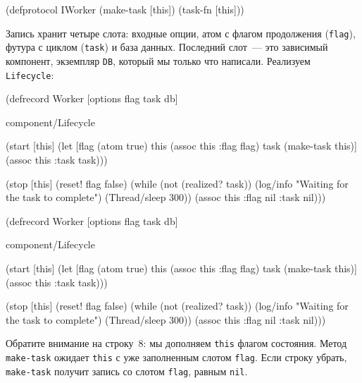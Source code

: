 \begin{english}
  \begin{clojure}
(defprotocol IWorker
  (make-task [this])
  (task-fn [this]))
  \end{clojure}
\end{english}

Запись хранит четыре слота: входные опции, атом с флагом продолжения
(\verb|flag|), футура с циклом (\verb|task|) и база данных. Последний слот~---
это зависимый компонент, экземпляр \verb|DB|, который мы только что
написали. Реализуем \verb|Lifecycle|:

\ifx\DEVICETYPE\MOBILE

\begin{english}
  \begin{clojure/lines}
(defrecord Worker
  [options flag task db]

  component/Lifecycle

  (start [this]
    (let [flag (atom true)
          this (assoc this :flag flag)
          task (make-task this)]
      (assoc this :task task)))

  (stop [this]
    (reset! flag false)
    (while (not (realized? task))
      (log/info
        "Waiting for
             the task to complete")
      (Thread/sleep 300))
    (assoc this :flag nil :task nil)))
  \end{clojure/lines}
\end{english}

\else

\begin{english}
  \begin{clojure/lines}
(defrecord Worker
  [options flag task db]

  component/Lifecycle

  (start [this]
    (let [flag (atom true)
          this (assoc this :flag flag)
          task (make-task this)]
      (assoc this :task task)))

  (stop [this]
    (reset! flag false)
    (while (not (realized? task))
      (log/info "Waiting for the task to complete")
      (Thread/sleep 300))
    (assoc this :flag nil :task nil)))
  \end{clojure/lines}
\end{english}

\fi

Обратите внимание на строку~8: мы дополняем \verb|this| флагом состояния. Метод
\verb|make-task| ожидает \verb|this| с уже заполненным слотом \verb|flag|. Если
строку убрать, \verb|make-task| получит запись со слотом \verb|flag|, равным
\verb|nil|.

